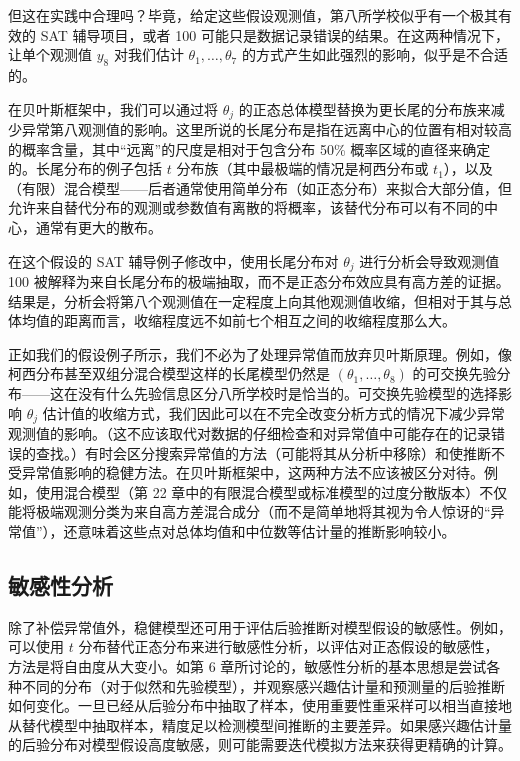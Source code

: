 但这在实践中合理吗？毕竟，给定这些假设观测值，第八所学校似乎有一个极其有效的 SAT 辅导项目，或者 100 可能只是数据记录错误的结果。在这两种情况下，让单个观测值 $y_8$ 对我们估计 $\theta_1, \ldots, \theta_7$ 的方式产生如此强烈的影响，似乎是不合适的。

在贝叶斯框架中，我们可以通过将 $\theta_j$ 的正态总体模型替换为更长尾的分布族来减少异常第八观测值的影响。这里所说的长尾分布是指在远离中心的位置有相对较高的概率含量，其中``远离''的尺度是相对于包含分布 50\% 概率区域的直径来确定的。长尾分布的例子包括 $t$ 分布族（其中最极端的情况是柯西分布或 $t_1$），以及（有限）混合模型——后者通常使用简单分布（如正态分布）来拟合大部分值，但允许来自替代分布的观测或参数值有离散的将概率，该替代分布可以有不同的中心，通常有更大的散布。

在这个假设的 SAT 辅导例子修改中，使用长尾分布对 $\theta_j$ 进行分析会导致观测值 100 被解释为来自长尾分布的极端抽取，而不是正态分布效应具有高方差的证据。结果是，分析会将第八个观测值在一定程度上向其他观测值收缩，但相对于其与总体均值的距离而言，收缩程度远不如前七个相互之间的收缩程度那么大。

正如我们的假设例子所示，我们不必为了处理异常值而放弃贝叶斯原理。例如，像柯西分布甚至双组分混合模型这样的长尾模型仍然是 $(\theta_1, \ldots, \theta_8)$ 的可交换先验分布——这在没有什么先验信息区分八所学校时是恰当的。可交换先验模型的选择影响 $\theta_j$ 估计值的收缩方式，我们因此可以在不完全改变分析方式的情况下减少异常观测值的影响。（这不应该取代对数据的仔细检查和对异常值中可能存在的记录错误的查找。）有时会区分搜索异常值的方法（可能将其从分析中移除）和使推断不受异常值影响的稳健方法。在贝叶斯框架中，这两种方法不应该被区分对待。例如，使用混合模型（第 22 章中的有限混合模型或标准模型的过度分散版本）不仅能将极端观测分类为来自高方差混合成分（而不是简单地将其视为令人惊讶的``异常值''），还意味着这些点对总体均值和中位数等估计量的推断影响较小。

\subsection{敏感性分析}

除了补偿异常值外，稳健模型还可用于评估后验推断对模型假设的敏感性。例如，可以使用 $t$ 分布替代正态分布来进行敏感性分析，以评估对正态假设的敏感性，方法是将自由度从大变小。如第 6 章所讨论的，敏感性分析的基本思想是尝试各种不同的分布（对于似然和先验模型），并观察感兴趣估计量和预测量的后验推断如何变化。一旦已经从后验分布中抽取了样本，使用重要性重采样可以相当直接地从替代模型中抽取样本，精度足以检测模型间推断的主要差异。如果感兴趣估计量的后验分布对模型假设高度敏感，则可能需要迭代模拟方法来获得更精确的计算。

